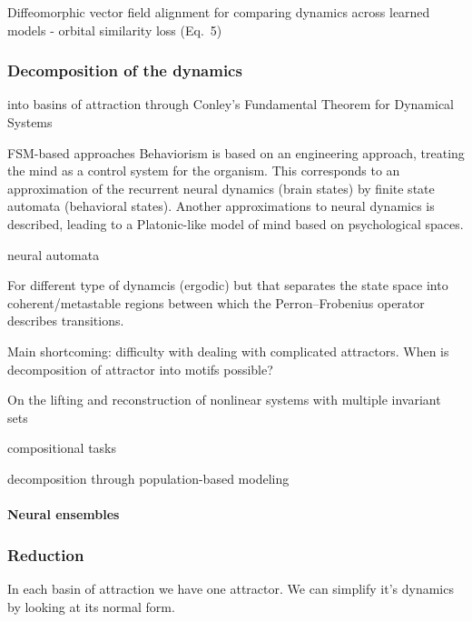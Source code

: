 \documentclass{article}
\theoremstyle{definition} \newtheorem{definition}{Definition}  \newtheorem{example}{Example}
\theoremstyle{remark} \newtheorem{remark}{Remark}
\newcounter{ct}
\begin{document}
Diffeomorphic vector field alignment for comparing dynamics across learned models\citep{chen2024dform}
- orbital similarity loss (Eq.~5)



\subsubsection{Decomposition of the dynamics}\label{sec:decomposition}
into basins of attraction through Conley’s Fundamental Theorem for Dynamical Systems \citep{conley1978morse, norton1995fundamental,mischaikow1999cit}

FSM-based approaches\citep{pollack1991induction, casey1996dynamics, jacobsson2005ruleextraction, ashwin2021excitable, oliva2019fsm, cotteret2024fsm}
Behaviorism is based on an engineering approach, treating the mind as a control system for the organism. This corresponds to an approximation of the recurrent neural dynamics (brain states) by finite state automata (behavioral states). Another approximations to neural dynamics is described, leading to a Platonic-like model of mind based on psychological spaces. \citep{duch1998platonic}

neural automata\citep{goles2013neural, uria2024invariants}

For different type of dynamcis (ergodic) but that separates the state space into coherent/metastable regions between which the Perron–Frobenius operator describes transitions.

Main shortcoming: difficulty with dealing with complicated attractors.
When is decomposition of attractor into motifs possible?

On the lifting and reconstruction of nonlinear systems with multiple invariant sets \citep{pan2024lifting}

\citep{driscoll2024flexible}

compositional tasks \citep{tafazoli2024building}

decomposition through population-based modeling\citep{glaser2020recurrent} 

\paragraph{Neural ensembles}
\citep{yuste2024ensembles}



\subsubsection{Reduction}\label{sec:reduction} %
In each basin of attraction we have one attractor.
We can simplify it's dynamics by looking at its normal form.
\end{document}
